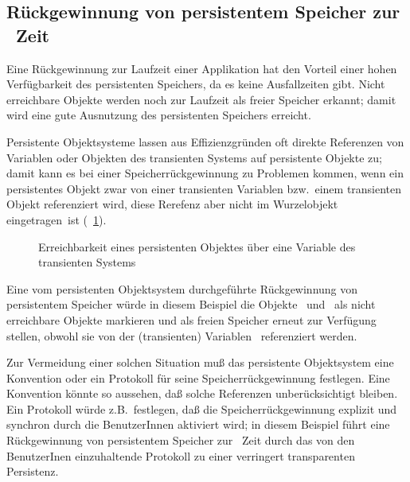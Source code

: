 \subsection{R\"{u}ckgewinnung von persistentem Speicher zur
\online\ Zeit}
%
Eine R\"{u}ckgewinnung zur Laufzeit einer Applikation hat den Vorteil
einer hohen Verf\"{u}gbarkeit des persistenten Speichers, da es keine
Ausfallzeiten gibt. Nicht erreichbare Objekte werden noch zur Laufzeit
als freier Speicher erkannt; damit wird eine gute Ausnutzung des
persistenten Speichers erreicht.
%
\par{}Persistente Objektsysteme lassen aus Effizienzgr\"{u}nden oft
direkte Referenzen von Variablen oder Objekten des transienten Systems
auf persistente Objekte zu; damit kann es bei einer
Speicherr\"{u}ckgewinnung zu Problemen kommen, wenn ein persistentes
Objekt zwar von einer transienten Variablen bzw.\ einem transienten
Objekt referenziert wird, diese Rerefenz aber nicht im Wurzelobjekt
\rglq{}eingetragen\rgrq\ ist (\figurename~\ref{fig:gctrpe}).
%
\begin{figure}[htbp]%
\ifbuch%
\centerline{}%
\else%
\centerline{}%
\fi%
\caption{Erreichbarkeit eines persistenten Objektes \"{u}ber eine Variable
des transienten Systems}\label{fig:gctrpe}%
\end{figure}%
%
Eine vom persistenten Objektsystem durch\-ge\-f\"{u}hr\-te R\"{u}ckgewinnung
von persistentem Speicher w\"{u}rde in diesem Beispiel die Objekte
\ov\ und \ovi\ als nicht erreichbare Objekte markieren und als freien
Speicher erneut zur Verf\"{u}gung stellen, obwohl sie von der
(transienten) Variablen \ referenziert werden.
%
\par{}Zur Vermeidung einer solchen Situation mu\ss{} das persistente
Objektsystem eine Konvention oder ein Protokoll f\"{u}r seine
Speicherr\"{u}ckgewinnung festlegen. Eine Konvention k\"{o}nnte so aussehen,
da\ss{} solche Referenzen unber\"{u}cksichtigt bleiben. Ein Protokoll w\"{u}rde
z.B.\ festlegen, da\ss{} die Speicherr\"{u}ckgewinnung explizit und synchron
durch die BenutzerInnen aktiviert wird; in diesem Beispiel f\"{u}hrt eine
R\"{u}ckgewinnung von persistentem Speicher zur \online\ Zeit durch das
von den BenutzerInen einzuhaltende Protokoll zu einer verringert
transparenten Persistenz.
%

